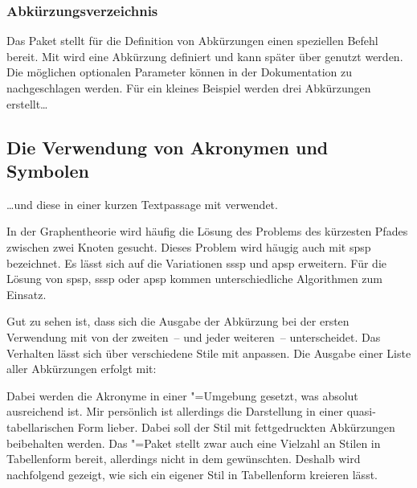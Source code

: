 \documentclass[%
  english,ngerman,%
  geometry=no,DIV=12,automark,%
]{tudscrartcl}
\begin{document}
\subsubsection{Abkürzungsverzeichnis}
Das Paket  stellt für die Definition von Abkürzungen einen 
speziellen Befehl bereit. Mit\LParameter{}%
 wird eine Abkürzung definiert und 
kann später über  genutzt werden. Die möglichen optionalen 
Parameter können in der Dokumentation zu  nachgeschlagen 
werden. Für ein kleines Beispiel werden drei Abkürzungen erstellt\dots
%
\begin{Trunk+}
\section{Die Verwendung von Akronymen und Symbolen}
\end{Trunk+}
\begin{Trunk*}

\end{Trunk*}
%
\dots und diese in einer kurzen Textpassage mit  
verwendet.
%
\begin{Trunk*}
In der Graphentheorie wird häufig die Lösung des Problems des kürzesten
Pfades zwischen zwei Knoten gesucht. Dieses Problem wird häugig auch
mit \gls{spsp} bezeichnet. Es lässt sich auf die Variationen \gls{sssp}
und \gls{apsp} erweitern. Für die Lösung von \gls{spsp}, \gls{sssp} 
oder \gls{apsp} kommen unterschiedliche Algorithmen zum Einsatz.

\end{Trunk*}
%
Gut zu sehen ist, dass sich die Ausgabe der Abkürzung bei der ersten Verwendung 
mit  von der zweiten~-- und jeder weiteren~-- unterscheidet. Das 
Verhalten lässt sich über verschiedene Stile mit  
anpassen. Die Ausgabe einer Liste aller Abkürzungen erfolgt mit:
%
\begin{Hint}
\printacronyms
\end{Hint}
\begin{quoting}[rightmargin=0pt]
\vspace*{-\baselineskipglue}
\glsdisablehyper
\InputCode
\end{quoting}
%
Dabei werden die Akronyme in einer "=Umgebung gesetzt, 
was absolut ausreichend ist. Mir persönlich ist allerdings die Darstellung in 
einer quasi-tabellarischen Form lieber. Dabei soll der Stil mit fettgedruckten 
Abkürzungen beibehalten werden. Das "=Paket stellt zwar 
auch eine Vielzahl an Stilen in Tabellenform bereit, allerdings nicht in dem 
gewünschten. Deshalb wird nachfolgend gezeigt, wie sich ein eigener Stil in 
Tabellenform kreieren lässt.
\end{document}
